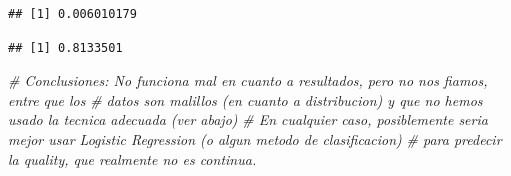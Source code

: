 \documentclass[12pt,]{article}
\newenvironment{Shaded}{\begin{snugshade}}{\end{snugshade}}
\newcommand{\KeywordTok}[1]{\textcolor[rgb]{0.13,0.29,0.53}{\textbf{{#1}}}}
\newcommand{\DecValTok}[1]{\textcolor[rgb]{0.00,0.00,0.81}{{#1}}}
\newcommand{\StringTok}[1]{\textcolor[rgb]{0.31,0.60,0.02}{{#1}}}
\newcommand{\CommentTok}[1]{\textcolor[rgb]{0.56,0.35,0.01}{\textit{{#1}}}}
\newcommand{\NormalTok}[1]{{#1}}
\begin{document}
\begin{verbatim}
## [1] 0.006010179
\end{verbatim}

\begin{Shaded}
\end{Shaded}

\begin{verbatim}
## [1] 0.8133501
\end{verbatim}

\begin{Shaded}
\begin{Highlighting}[]
\CommentTok{# Conclusiones: No funciona mal en cuanto a resultados, pero no nos fiamos, entre que los}
\CommentTok{# datos son malillos (en cuanto a distribucion) y que no hemos usado la tecnica adecuada (ver abajo)}
\CommentTok{# En cualquier caso, posiblemente seria mejor usar Logistic Regression (o algun metodo de clasificacion)}
\CommentTok{# para predecir la quality, que realmente no es continua.}
\end{Highlighting}
\end{Shaded}
\end{document}
